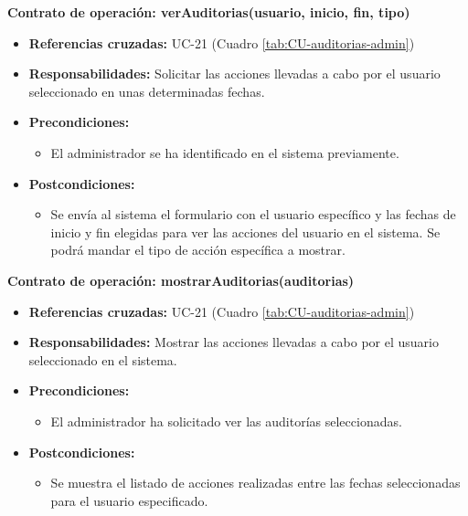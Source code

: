 \textbf{Contrato de operación: verAuditorias(usuario, inicio, fin, tipo)}
\begin{itemize}
\item \textbf{Referencias cruzadas:} UC-21 (Cuadro \ref{tab:CU-auditorias-admin})
\item \textbf{Responsabilidades:} Solicitar las acciones llevadas a cabo por el usuario seleccionado en unas determinadas fechas.
\item \textbf{Precondiciones:} 
 \begin{itemize}
\item El administrador se ha identificado en el sistema previamente.
\end {itemize}
\item \textbf{Postcondiciones:} 
 \begin{itemize}
\item Se envía al sistema el formulario con el usuario específico y las fechas de inicio y fin elegidas para ver las acciones del usuario en el sistema. Se podrá mandar el tipo de acción específica a mostrar.
\end {itemize}
\end {itemize}

\textbf{Contrato de operación: mostrarAuditorias(auditorias)}
\begin{itemize}
\item \textbf{Referencias cruzadas:} UC-21 (Cuadro \ref{tab:CU-auditorias-admin})
\item \textbf{Responsabilidades:} Mostrar las acciones llevadas a cabo por el usuario seleccionado en el sistema.
\item \textbf{Precondiciones:} 
 \begin{itemize}
\item El administrador ha solicitado ver las auditorías seleccionadas.
\end {itemize}
\item \textbf{Postcondiciones:} 
 \begin{itemize}
\item Se muestra el listado de acciones realizadas entre las fechas seleccionadas para el usuario especificado.
\end {itemize}
\end {itemize}

\vspace{7mm}
\dotfill
\vspace{7mm}


